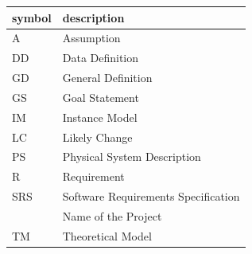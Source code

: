 \documentclass[12pt]{article}
\begin{document}
\renewcommand{\arraystretch}{1.2}
\begin{tabular}{l l} 
  \toprule		
  \textbf{symbol} & \textbf{description}\\
  \midrule 
  A & Assumption\\
  DD & Data Definition\\
  GD & General Definition\\
  GS & Goal Statement\\
  IM & Instance Model\\
  LC & Likely Change\\
  PS & Physical System Description\\
  R & Requirement\\
  SRS & Software Requirements Specification\\
  \progname{} & Name of the Project\\
  TM & Theoretical Model\\
  \bottomrule
\end{tabular}\\





\newpage


\end{document}
